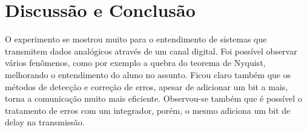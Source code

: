 \newpage
\section{Discussão e Conclusão}
O experimento se mostrou muito para o entendimento de sistemas que transmitem dados analógicos através de um canal digital.
Foi possível observar vários fenômenos, como por exemplo a quebra do teorema de Nyquist, melhorando o entendimento do aluno no assunto.
Ficou claro também que os métodos de detecção e correção de erros, apesar de adicionar um bit a mais, torna a comunicação muito mais eficiente.
Observou-se também que é possível o tratamento de erros com um integrador, porém, o mesmo adiciona um bit de delay na transmissão.